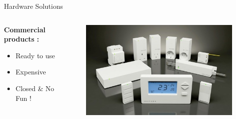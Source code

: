 \documentclass{beamer}
\begin{document}
\begin{frame}{Hardware Solutions}
\begin{columns}
\begin{column}[l]{0.5\textwidth}
\textbf{Commercial products :}
\begin{itemize}
\item[\Large\smiley] Ready to use
\item[\Large\frownie] Expensive
\item[\Large\frownie] Closed \& No Fun !

\end{itemize}
\end{column}
\begin{column}[r]{0.5\textwidth}
\begin{figure}
\includegraphics[width=\columnwidth]{./figures/Home-Automation-Products.jpg}
\end{figure}
\end{column}
\end{columns}


\end{frame}
\end{document}
